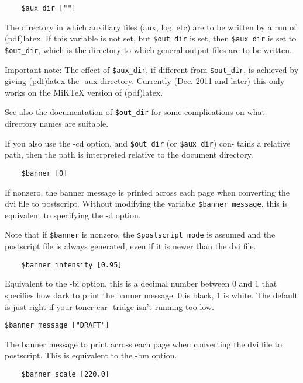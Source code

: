 \begin{verbatim}
	$aux_dir [""]
\end{verbatim}

The directory in which auxiliary files (aux, log, etc) are to be
written  by  a  run of (pdf)latex.  If this variable is not set,
but \verb|$out_dir| is set, then \verb|$aux_dir| is set to \verb|$out_dir|, which  is
the directory to which general output files are to be written.

Important  note:   The  effect  of  \verb|$aux_dir|,  if different from
\verb|$out_dir|, is achieved by giving (pdf)latex  the  -aux-directory.  Currently
(Dec.  2011  and later) this only works on the MiKTeX version of (pdf)latex.

See also the documentation of \verb|$out_dir| for some complications on what directory
names are suitable.

If  you also use the -cd option, and \verb|$out_dir| (or \verb|$aux_dir|) con-
tains a relative path, then the path is interpreted relative  to
the document directory.

\begin{verbatim}
	$banner [0]
\end{verbatim}

If  nonzero, the banner message is printed across each page when converting the
dvi file to postscript.   Without  modifying  the variable  \verb|$banner_message|,
this is equivalent to specifying the -d option.

Note that if \verb|$banner| is nonzero, the \verb|$postscript_mode| is assumed
and the postscript file is always generated, even if it is newer
than the dvi file.

\begin{verbatim}
	$banner_intensity [0.95]
\end{verbatim}

Equivalent to the -bi option, this is a decimal number between 0
and  1 that specifies how dark to print the banner message. 0 is
black, 1 is white.  The default is just right if your toner car-
tridge isn't running too low.

\begin{verbatim}
$banner_message ["DRAFT"]
\end{verbatim}

The banner message to print across each page when converting the
dvi file to postscript.  This is equivalent to the -bm option.

\begin{verbatim}
	$banner_scale [220.0]
\end{verbatim}

